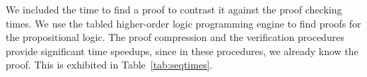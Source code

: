\documentclass{llncs}
\begin{document}
We included the time to find a proof to contrast it against the proof
checking times. We use the tabled higher-order logic programming
engine \cite{Pientka05,Pientka03phd} to find proofs for the
propositional logic. The proof compression and the verification procedures
provide significant time speedups, since in these procedures, we already
know the proof. This is exhibited in Table~\ref{tab:seqtimes}.

\end{document}
